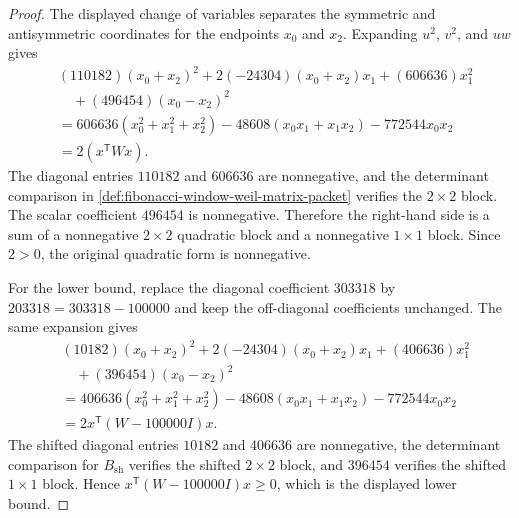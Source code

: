 \begin{proof}
The displayed change of variables separates the symmetric and antisymmetric coordinates for the endpoints $x_0$ and $x_2$. Expanding $u^2$, $v^2$, and $uw$ gives
$$
\begin{aligned}
&(110182)(x_0+x_2)^2+2(-24304)(x_0+x_2)x_1+(606636)x_1^2\\
&\quad +(496454)(x_0-x_2)^2\\
&=606636(x_0^2+x_1^2+x_2^2)-48608(x_0x_1+x_1x_2)-772544x_0x_2\\
&=2(x^{\mathsf T}Wx).
\end{aligned}
$$
The diagonal entries $110182$ and $606636$ are nonnegative, and the determinant comparison in \autoref{def:fibonacci-window-weil-matrix-packet} verifies the $2\times2$ block. The scalar coefficient $496454$ is nonnegative. Therefore the right-hand side is a sum of a nonnegative $2\times2$ quadratic block and a nonnegative $1\times1$ block. Since $2>0$, the original quadratic form is nonnegative.

For the lower bound, replace the diagonal coefficient $303318$ by $203318=303318-100000$ and keep the off-diagonal coefficients unchanged. The same expansion gives
$$
\begin{aligned}
&(10182)(x_0+x_2)^2+2(-24304)(x_0+x_2)x_1+(406636)x_1^2\\
&\quad +(396454)(x_0-x_2)^2\\
&=406636(x_0^2+x_1^2+x_2^2)-48608(x_0x_1+x_1x_2)-772544x_0x_2\\
&=2x^{\mathsf T}(W-100000I)x.
\end{aligned}
$$
The shifted diagonal entries $10182$ and $406636$ are nonnegative, the determinant comparison for $B_{\mathrm{sh}}$ verifies the shifted $2\times2$ block, and $396454$ verifies the shifted $1\times1$ block. Hence $x^{\mathsf T}(W-100000I)x\geq0$, which is the displayed lower bound.
\end{proof}


